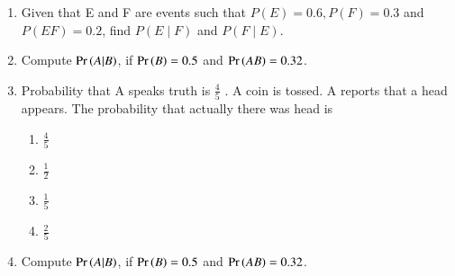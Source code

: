 \begin{enumerate}[label=\thechapter.\arabic*,ref=\thechapter.\theenumi]
	\item 
Given that E and F are events such that $P(E)=0.6, P(F)=0.3$ and $P(E F)=0.2$, find $P(E \mid F)$ and $P(F \mid E)$.
\\

	\item Compute $\Pr\left(A|B\right)$, if $\Pr\left(B\right)=0.5$ and $\Pr\left(AB\right)=0.32$. 
		\\
	\item Probability that A speaks truth is
$\frac{4}{5}$ . A coin is tossed. A reports that a head
appears. The probability that actually there was head is
\begin{enumerate}
    \item $\frac{4}{5}$ 
\item $\frac{1}{2}$ 
\item $\frac{1}{5}$ 
\item $\frac{2}{5}$
\end{enumerate}
	\item Compute $\Pr\left(A|B\right)$, if $\Pr\left(B\right)=0.5$ and $\Pr\left(AB\right)=0.32$. 
		\\
		


\end{enumerate}
